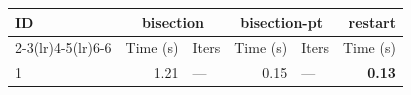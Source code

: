 \begin{longtable}{lr@{\hskip 4pt}l@{\hskip 12pt}r@{\hskip 4pt}l@{\hskip 12pt}r}
\toprule
ID & \multicolumn{2}{c}{bisection} & \multicolumn{2}{c}{bisection-pt} & restart \\
\cmidrule(lr){2-3}\cmidrule(lr){4-5}\cmidrule(lr){6-6}
 & Time (s) &  Iters & Time (s) &  Iters & Time (s) \\
\midrule
\endhead
1 & 1.21 & --- & 0.15 & --- & \textbf{0.13} \\
\bottomrule
\end{longtable}